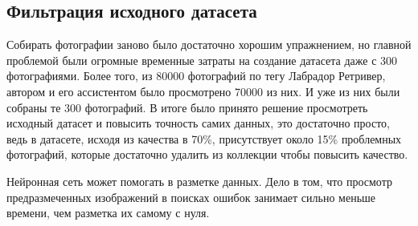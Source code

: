\subsection{Фильтрация исходного датасета} \label{subsect3_1_2}
Собирать фотографии заново было достаточно хорошим упражнением, но главной проблемой были огромные временные затраты на создание датасета даже с 300 фотографиями. Более того, из 80000 фотографий по тегу Лабрадор Ретривер, автором и его ассистентом было просмотрено 70000 из них. И уже из них были собраны те 300 фотографий.
В итоге было принято решение просмотреть исходный датасет и повысить точность самих данных, это достаточно просто, ведь в датасете, исходя из качества в 70\%, присутствует около 15\% проблемных фотографий, которые достаточно удалить из коллекции чтобы повысить качество.

% 
%
%

Нейронная сеть может помогать в разметке данных. Дело в том, что просмотр предразмеченных изображений в поисках ошибок занимает сильно меньше времени, чем разметка их самому с нуля. 


